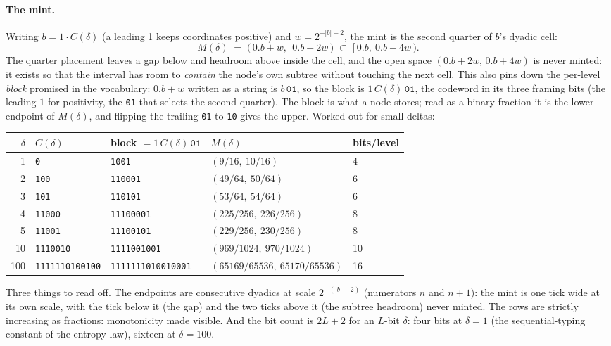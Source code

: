 \documentclass[11pt]{article}
\newcommand{\code}[1]{\texttt{#1}}
\begin{document}
\paragraph{The mint.} Writing $b = 1 \cdot C(\delta)$ (a leading 1
keeps coordinates positive) and $w = 2^{-|b|-2}$, the mint is the
second quarter of $b$'s dyadic cell:
\[
  M(\delta) \;=\; \bigl(\,0.b + w,\ \ 0.b + 2w\,\bigr)
  \;\subset\; \bigl[\,0.b,\ 0.b + 4w\,\bigr) .
\]
The quarter placement leaves a gap below and headroom above inside the
cell, and the open space $(0.b+2w,\, 0.b+4w)$ is never minted: it
exists so that the interval has room to \emph{contain} the node's own
subtree without touching the next cell. This also pins down the
per-level \emph{block} promised in the vocabulary: $0.b + w$ written
as a string is $b\,\code{01}$, so the block is
$1\,C(\delta)\,\code{01}$, the codeword in its three framing bits
(the leading $1$ for positivity, the \code{01} that selects the
second quarter). The block is what a node stores; read as a binary
fraction it is the lower endpoint of $M(\delta)$, and flipping the
trailing \code{01} to \code{10} gives the upper. Worked out for
small deltas:

\begin{center}\small
\begin{tabular}{@{}rllll@{}}
\toprule
$\delta$ & $C(\delta)$ & block $= 1\,C(\delta)\,\code{01}$ &
  $M(\delta)$ & bits/level \\
\midrule
1   & \code{0}             & \code{1001}     & $(9/16,\ 10/16)$   & 4 \\
2   & \code{100}           & \code{110001}   & $(49/64,\ 50/64)$  & 6 \\
3   & \code{101}           & \code{110101}   & $(53/64,\ 54/64)$  & 6 \\
4   & \code{11000}         & \code{11100001} & $(225/256,\ 226/256)$ & 8 \\
5   & \code{11001}         & \code{11100101} & $(229/256,\ 230/256)$ & 8 \\
10  & \code{1110010}       & \code{1111001001} & $(969/1024,\ 970/1024)$ & 10 \\
100 & \code{1111110100100} & \code{1111111010010001} &
  $(65169/65536,\ 65170/65536)$ & 16 \\
\bottomrule
\end{tabular}
\end{center}

\noindent Three things to read off. The endpoints are consecutive
dyadics at scale $2^{-(|b|+2)}$ (numerators $n$ and $n{+}1$): the
mint is one tick wide at its own scale, with the tick below it (the
gap) and the two ticks above it (the subtree headroom) never minted.
The rows are strictly increasing as fractions: monotonicity made
visible. And the bit count is $2L + 2$ for an $L$-bit $\delta$: four
bits at $\delta = 1$ (the sequential-typing constant of the entropy
law), sixteen at $\delta = 100$.
\end{document}
